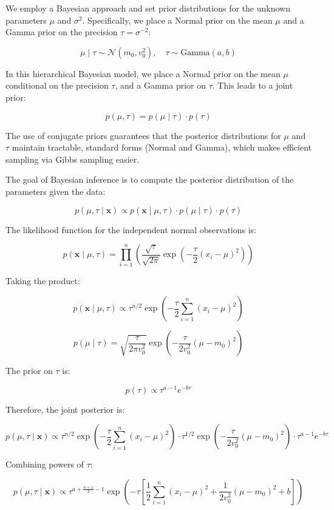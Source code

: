 \documentclass[]{article}
\begin{document}
We employ a Bayesian approach and set prior distributions for the unknown parameters $\mu$ and $\sigma^2$. Specifically, we place a Normal prior on the mean $\mu$ and a Gamma prior on the precision $\tau = \sigma^{-2}$:

$$
\mu \mid \tau \sim \mathcal{N}(m_0, v_0^2), \quad \tau \sim \text{Gamma}(a, b)
$$

In this hierarchical Bayesian model, we place a Normal prior on the mean $\mu$ conditional on the precision $\tau$, and a Gamma prior on $\tau$. This leads to a joint prior:

$$
p(\mu, \tau) = p(\mu \mid \tau) \cdot p(\tau)
$$

The use of conjugate priors guarantees that the posterior distributions for $\mu$ and $\tau$ maintain tractable, standard forms (Normal and Gamma), which makes efficient sampling via Gibbs sampling easier.

The goal of Bayesian inference is to compute the posterior distribution of the parameters given the data:

$$
p(\mu, \tau \mid \mathbf{x}) \propto p(\mathbf{x} \mid \mu, \tau) \cdot p(\mu \mid \tau) \cdot p(\tau)
$$

The likelihood function for the independent normal observations is:

$$
p(\mathbf{x} \mid \mu, \tau) = \prod_{i=1}^n \left( \frac{\sqrt{\tau}}{\sqrt{2\pi}} \exp\left( -\frac{\tau}{2}(x_i - \mu)^2 \right) \right)
$$

Taking the product:

$$
p(\mathbf{x} \mid \mu, \tau) \propto \tau^{n/2} \exp\left( -\frac{\tau}{2} \sum_{i=1}^n (x_i - \mu)^2 \right)
$$


\[
p(\mu \mid \tau) = \sqrt{\frac{\tau}{2\pi v_0^2}} \exp\left( -\frac{\tau}{2v_0^2} (\mu - m_0)^2 \right)
\]

The prior on $\tau$ is:

$$
p(\tau) \propto \tau^{a - 1} e^{-b\tau}
$$

Therefore, the joint posterior is:

$$
p(\mu, \tau \mid \mathbf{x}) \propto \tau^{n/2} \exp\left( -\frac{\tau}{2} \sum_{i=1}^n (x_i - \mu)^2 \right) \cdot \tau^{1/2} \exp\left( -\frac{\tau}{2v_0^2} (\mu - m_0)^2 \right) \cdot \tau^{a-1} e^{-b\tau}
$$

Combining powers of $\tau$:

$$
p(\mu, \tau \mid \mathbf{x}) \propto \tau^{a + \frac{n+1}{2} - 1} \exp\left( -\tau \left[ \frac{1}{2} \sum_{i=1}^n (x_i - \mu)^2 + \frac{1}{2v_0^2} (\mu - m_0)^2 + b \right] \right)
$$
\end{document}
